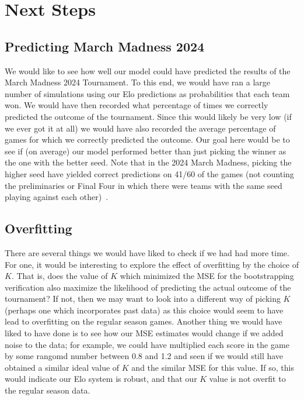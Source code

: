 \documentclass{article}
\begin{document}



\section{Next Steps}\label{nextSteps}
\subsection{Predicting March Madness 2024}
We would like to see how well our model could have predicted the results of the March Madness 2024 Tournament. To this end, we would have ran a large number of simulations using our Elo predictions as probabilities that each team won. We would have then recorded what percentage of times we correctly predicted the outcome of the tournament. Since this would likely be very low (if we ever got it at all) we would have also recorded the average percentage of games for which we correctly predicted the outcome. Our goal here would be to see if (on average) our model performed better than just picking the winner as the one with the better seed. Note that in the 2024 March Madness, picking the higher seed have yielded correct predictions on 41/60 of the games (not counting the preliminaries or Final Four in which there were teams with the same seed playing against each other)~\cite{wikipedia2024NCAA}.

\subsection{Overfitting}
There are several things we would have liked to check if we had had more time. For one, it would be interesting to explore the effect of overfitting by the choice of $K$. That is, does the value of $K$ which minimized the MSE for the bootstrapping verification also maximize the likelihood of predicting the actual outcome of the tournament? If not, then we may want to look into a different way of picking $K$ (perhaps one which incorporates past data) as this choice would seem to have lead to overfitting on the regular season games. Another thing we would have liked to have done is to see how our MSE estimates would change if we added noise to the data; for example, we could have multiplied each score in the game by some rangomd number between 0.8 and 1.2 and seen if we would still have obtained a similar ideal value of $K$ and the similar MSE for this value. If so, this would indicate our Elo system is robust, and that our $K$ value is not overfit to the regular season data.
\end{document}
